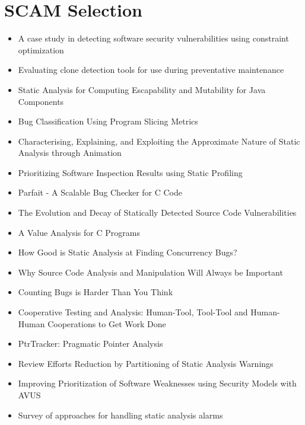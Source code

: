 \section{SCAM Selection}
\label{apx:sec:scam}
\begin{itemize}
\item A case study in detecting software security vulnerabilities using constraint optimization~\cite{weber2001case}
\item Evaluating clone detection tools for use during preventative maintenance~\cite{burd2002evaluating}
\item Static Analysis for Computing Escapability and Mutability for Java Components~\cite{shi2005static}
\item Bug Classification Using Program Slicing Metrics~\cite{pan_bug_2006}
\item Characterising, Explaining, and Exploiting the Approximate Nature of Static Analysis through Animation~\cite{binkley2006characterising}
\item Prioritizing Software Inspection Results using Static Profiling~\cite{boogerd2006prioritizing}
\item Parfait - A Scalable Bug Checker for C Code~\cite{cifuentes2008parfait}
\item The Evolution and Decay of Statically Detected Source Code Vulnerabilities~\cite{penta_evolution_2008}
\item A Value Analysis for C Programs~\cite{canet2009value}
\item How Good is Static Analysis at Finding Concurrency Bugs?~\cite{kester2010good}
\item Why Source Code Analysis and Manipulation Will Always be Important~\cite{harman2010source}
\item Counting Bugs is Harder Than You Think~\cite{black_counting_2011}
\item Cooperative Testing and Analysis: Human-Tool, Tool-Tool and Human-Human Cooperations to Get Work Done~\cite{xie2012cooperative}
\item PtrTracker: Pragmatic Pointer Analysis~\cite{huuck2013ptrtracker}
\item Review Efforts Reduction by Partitioning of Static Analysis Warnings~\cite{muske2013review}
\item Improving Prioritization of Software Weaknesses using Security Models with AVUS~\cite{renatus2015improving}
\item Survey of approaches for handling static analysis alarms~\cite{muske2016survey}
\end{itemize}

